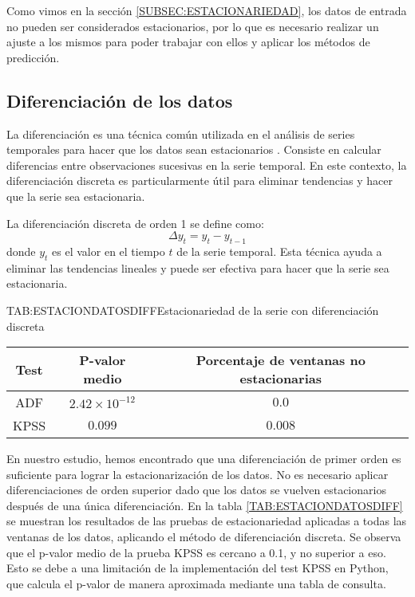 Como vimos en la sección \ref{SUBSEC:ESTACIONARIEDAD}, los datos de entrada no pueden ser considerados estacionarios, por lo que es necesario realizar un ajuste a los mismos para poder trabajar con ellos y aplicar los métodos de predicción.

\subsection{Diferenciación de los datos}

La diferenciación es una técnica común utilizada en el análisis de series temporales para hacer que los datos sean estacionarios \cite{box2015time}. Consiste en calcular diferencias entre observaciones sucesivas en la serie temporal. En este contexto, la diferenciación discreta es particularmente útil para eliminar tendencias y hacer que la serie sea estacionaria.

La diferenciación discreta de orden 1 se define como:
\begin{equation}    
    \boxed{\Delta y_t}= y_t - y_{t-1}
\end{equation}
donde \( y_t \) es el valor en el tiempo \( t \) de la serie temporal. Esta técnica ayuda a eliminar las tendencias lineales y puede ser efectiva para hacer que la serie sea estacionaria.

\begin{table}[Estacionariedad de la serie con diferenciación discreta]{TAB:ESTACIONDATOSDIFF}{Estacionariedad de la serie con diferenciación discreta}
    \begin{tabular}{|c|c|c|}
        \hline
        \textbf{Test} & \textbf{P-valor medio} & \textbf{Porcentaje de ventanas no estacionarias} \\
        \hline
        ADF & $2.42\times 10^{-12}$ & $0.0$ \\
        KPSS & $0.099$ & $0.008$ \\
        \hline
    \end{tabular}
\end{table}

En nuestro estudio, hemos encontrado que una diferenciación de primer orden es suficiente para lograr la estacionarización de los datos. No es necesario aplicar diferenciaciones de orden superior dado que los datos se vuelven estacionarios después de una única diferenciación. En la tabla \ref{TAB:ESTACIONDATOSDIFF} se muestran los resultados de las pruebas de estacionariedad aplicadas a todas las ventanas de los datos, aplicando el método de diferenciación discreta. Se observa que el p-valor medio de la prueba KPSS es cercano a 0.1, y no superior a eso. Esto se debe a una limitación de la implementación del test KPSS en Python, que calcula el p-valor de manera aproximada mediante una tabla de consulta. 

